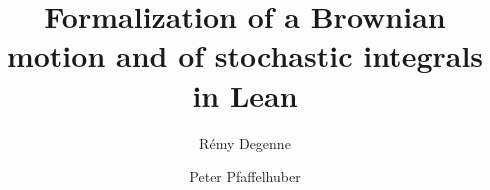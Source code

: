 \documentclass[a4paper]{report}
\title{Formalization of a Brownian motion and of stochastic integrals in Lean}
\author{Rémy Degenne \and Peter Pfaffelhuber}
\begin{document}
\bibliographyunit[\part]

\maketitle

\end{document}
